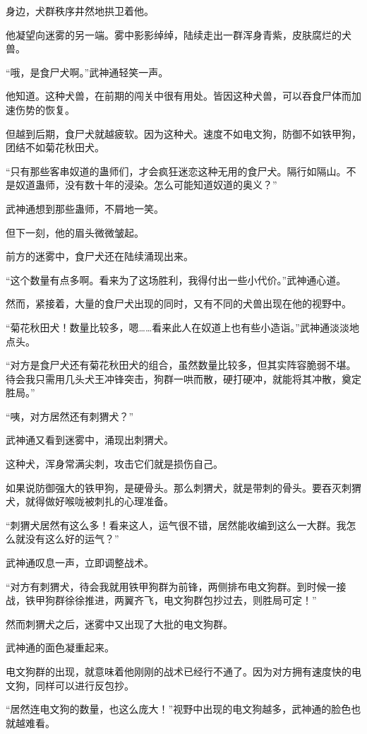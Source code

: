 \begin{this_body}
身边，犬群秩序井然地拱卫着他。

他凝望向迷雾的另一端。雾中影影绰绰，陆续走出一群浑身青紫，皮肤腐烂的犬兽。

“哦，是食尸犬啊。”武神通轻笑一声。

他知道。这种犬兽，在前期的闯关中很有用处。皆因这种犬兽，可以吞食尸体而加速伤势的恢复。

但越到后期，食尸犬就越疲软。因为这种犬。速度不如电文狗，防御不如铁甲狗，团结不如菊花秋田犬。

“只有那些客串奴道的蛊师们，才会疯狂迷恋这种无用的食尸犬。隔行如隔山。不是奴道蛊师，没有数十年的浸染。怎么可能知道奴道的奥义？”

武神通想到那些蛊师，不屑地一笑。

但下一刻，他的眉头微微皱起。

前方的迷雾中，食尸犬还在陆续涌现出来。

“这个数量有点多啊。看来为了这场胜利，我得付出一些小代价。”武神通心道。

然而，紧接着，大量的食尸犬出现的同时，又有不同的犬兽出现在他的视野中。

“菊花秋田犬！数量比较多，嗯……看来此人在奴道上也有些小造诣。”武神通淡淡地点头。

“对方是食尸犬还有菊花秋田犬的组合，虽然数量比较多，但其实阵容脆弱不堪。待会我只需用几头犬王冲锋突击，狗群一哄而散，硬打硬冲，就能将其冲散，奠定胜局。”

“咦，对方居然还有刺猬犬？”

武神通又看到迷雾中，涌现出刺猬犬。

这种犬，浑身常满尖刺，攻击它们就是损伤自己。

如果说防御强大的铁甲狗，是硬骨头。那么刺猬犬，就是带刺的骨头。要吞灭刺猬犬，就得做好喉咙被刺扎的心理准备。

“刺猬犬居然有这么多！看来这人，运气很不错，居然能收编到这么一大群。我怎么就没有这么好的运气？”

武神通叹息一声，立即调整战术。

“对方有刺猬犬，待会我就用铁甲狗群为前锋，两侧排布电文狗群。到时候一接战，铁甲狗群徐徐推进，两翼齐飞，电文狗群包抄过去，则胜局可定！”

然而刺猬犬之后，迷雾中又出现了大批的电文狗群。

武神通的面色凝重起来。

电文狗群的出现，就意味着他刚刚的战术已经行不通了。因为对方拥有速度快的电文狗，同样可以进行反包抄。

“居然连电文狗的数量，也这么庞大！”视野中出现的电文狗越多，武神通的脸色也就越难看。


\end{this_body}
